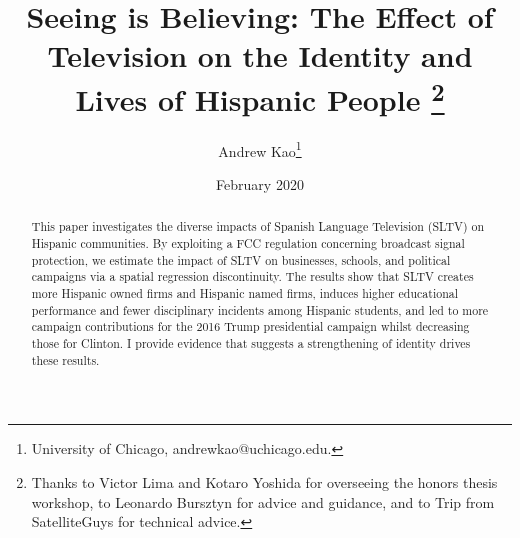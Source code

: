 \documentclass[11pt]{article}
\begin{document}
\title{\textbf{Seeing is Believing: The Effect of Television on the Identity and Lives of Hispanic People}%
\thanks{Thanks to Victor Lima and Kotaro Yoshida for overseeing the honors thesis workshop, to Leonardo Bursztyn for advice and guidance, and to Trip from SatelliteGuys for technical advice.}\\
}



\author{Andrew Kao\thanks{University of Chicago, andrewkao@uchicago.edu.} }

\date{February 2020}
{\vspace{-5ex}}


\maketitle

\begin{abstract}
\noindent This paper investigates the diverse impacts of Spanish Language Television (SLTV) on Hispanic communities. By exploiting a FCC regulation concerning broadcast signal protection, we estimate the impact of SLTV on businesses, schools, and political campaigns via a spatial regression discontinuity. The results show that SLTV creates more Hispanic owned firms and Hispanic named firms, induces higher educational performance and fewer disciplinary incidents among Hispanic students, and led to more campaign contributions for the 2016 Trump presidential campaign whilst decreasing those for Clinton. I provide evidence that suggests a strengthening of identity drives these results. 




\end{abstract}
\end{document}
